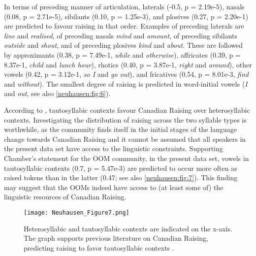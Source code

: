 \documentclass[output=paper]{langscibook}
\begin{document}
\largerpage
In terms of preceding manner of articulation, laterals (-0.5, p = 2.19e-5), nasals (0.08, p = 2.71e-5), sibilants (0.10, p = 1.25e-3), and plosives (0.27, p = 2.20e-1) are predicted to favour raising in that order. Examples of preceding laterals are \textit{line} and \textit{realised}, of preceding nasals \textit{mind} and \textit{amount}, of preceding sibilants \textit{outside} and \textit{shout}, and of preceding plosives \textit{kind} and \textit{about}. These are followed by approximants (0.38, p = 7.49e-1, \textit{while} and \textit{otherwise}), affricates (0.39, p = 8.37e-1, \textit{child} and \textit{lunch hour}), rhotics (0.40, p = 3.87e-1, \textit{right} and \textit{around}), other vowels (0.42, p = 3.12e-1, \textit{so I} and \textit{go out}), and fricatives (0.54, p = 8.01e-3, \textit{find} and \textit{without}). The smallest degree of raising is predicted in word-initial vowels (\textit{I} and \textit{out}, see also \autoref{neuhausen:fig:6}). 

According to \citet[79]{chambers_canadian_1989}, tautosyllabic contexts favour Canadian Raising over heterosyllabic contexts. Investigating the distribution of raising across the two syllable types is worthwhile, as the community finds itself in the initial stages of the language change towards Canadian Raising and it cannot be assumed that all speakers in the present data set have access to the linguistic constraints. Supporting Chamber’s statement for the \gls*{OOM} community, in the present data set, vowels in tautosyllabic contexts (0.7, p = 5.47e-3) are predicted to occur more often as raised tokens than in the latter (0.47; see also \autoref{neuhausen:fig:7}). This finding may suggest that the \glspl*{OOM} indeed have access to (at least some of) the linguistic resources of Canadian Raising.

\begin{figure}
    \texttt{[image: Neuhausen\_Figure7.png]}
    \caption{Heterosyllabic and tautosyllabic contexts are indicated on the x-axis. The graph supports previous literature on Canadian Raising, predicting raising to favor tautosyllabic contexts \citep[79]{chambers_canadian_1989}.}
    \label{neuhausen:fig:7}
\end{figure}
\end{document}

